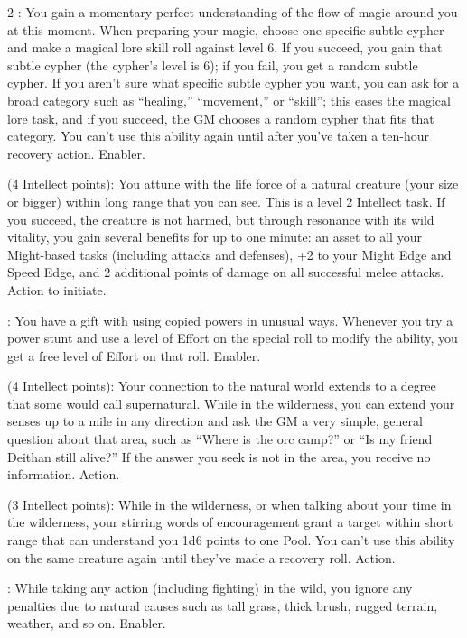 \begin{multicols}{2}
: You gain a momentary perfect understanding of the flow of magic around you at this moment. When preparing your magic, choose one specific subtle cypher and make a magical lore skill roll against level 6. If you succeed, you gain that subtle cypher (the cypher’s level is 6); if you fail, you get a random subtle cypher. If you aren’t sure what specific subtle cypher you want, you can ask for a broad category such as “healing,” “movement,” or “skill”; this eases the magical lore task, and if you succeed, the GM chooses a random cypher that fits that category. You can’t use this ability again until after you’ve taken a ten-hour recovery action. Enabler.
 
 (4 Intellect points): You attune with the life force of a natural creature (your size or bigger) within long range that you can see. This is a level 2 Intellect task. If you succeed, the creature is not harmed, but through resonance with its wild vitality, you gain several benefits for up to one minute: an asset to all your Might-based tasks (including attacks and defenses), +2 to your Might Edge and Speed Edge, and 2 additional points of damage on all successful melee attacks. Action to initiate. 

: You have a gift with using copied powers in unusual ways. Whenever you try a power stunt and use a level of Effort on the special roll to modify the ability, you get a free level of Effort on that roll. Enabler.

 (4 Intellect points): Your connection to the natural world extends to a degree that some would call supernatural. While in the wilderness, you can extend your senses up to a mile in any direction and ask the GM a very simple, general question about that area, such as “Where is the orc camp?” or “Is my friend Deithan still alive?” If the answer you seek is not in the area, you receive no information. Action. 
 
 (3 Intellect points): While in the wilderness, or when talking about your time in the wilderness, your stirring words of encouragement grant a target within short range that can understand you 1d6 points to one Pool. You can’t use this ability on the same creature again until they’ve made a recovery roll. Action.
 
: While taking any action (including fighting) in the wild, you ignore any penalties due to natural causes such as tall grass, thick brush, rugged terrain, weather, and so on. Enabler. 
 

\end{multicols}
